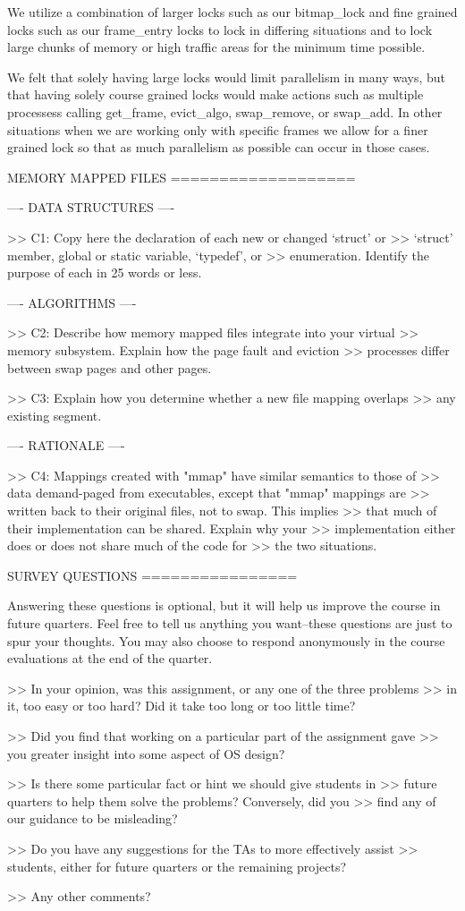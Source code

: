 We utilize a combination of larger locks such as our bitmap_lock and
fine grained locks such as our frame_entry locks to lock in differing
situations and to lock large chunks of memory or high traffic areas 
for the minimum time possible. 

We felt that solely having large locks would limit parallelism in many ways, 
but that having solely course grained locks would make actions such as multiple
processess calling get_frame, evict_algo, swap_remove, or swap_add. In other
situations when we are working only with specific frames we allow for a finer
grained lock so that as much parallelism as possible can occur in those cases.

             MEMORY MAPPED FILES
             ===================

---- DATA STRUCTURES ----

>> C1: Copy here the declaration of each new or changed `struct' or
>> `struct' member, global or static variable, `typedef', or
>> enumeration.  Identify the purpose of each in 25 words or less.

---- ALGORITHMS ----

>> C2: Describe how memory mapped files integrate into your virtual
>> memory subsystem.  Explain how the page fault and eviction
>> processes differ between swap pages and other pages.

>> C3: Explain how you determine whether a new file mapping overlaps
>> any existing segment.

---- RATIONALE ----

>> C4: Mappings created with "mmap" have similar semantics to those of
>> data demand-paged from executables, except that "mmap" mappings are
>> written back to their original files, not to swap.  This implies
>> that much of their implementation can be shared.  Explain why your
>> implementation either does or does not share much of the code for
>> the two situations.

               SURVEY QUESTIONS
               ================

Answering these questions is optional, but it will help us improve the
course in future quarters.  Feel free to tell us anything you
want--these questions are just to spur your thoughts.  You may also
choose to respond anonymously in the course evaluations at the end of
the quarter.

>> In your opinion, was this assignment, or any one of the three problems
>> in it, too easy or too hard?  Did it take too long or too little time?

>> Did you find that working on a particular part of the assignment gave
>> you greater insight into some aspect of OS design?

>> Is there some particular fact or hint we should give students in
>> future quarters to help them solve the problems?  Conversely, did you
>> find any of our guidance to be misleading?

>> Do you have any suggestions for the TAs to more effectively assist
>> students, either for future quarters or the remaining projects?

>> Any other comments?

